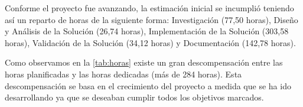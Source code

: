 \documentclass[../main.tex]{subfiles}
\begin{document}
Conforme el proyecto fue avanzando, la estimación inicial se incumplió teniendo así un reparto de horas de la siguiente forma: Investigación (77,50 horas), Diseño y Análisis de la Solución (26,74 horas), Implementación de la Solución (303,58 horas), Validación de la Solución (34,12 horas) y Documentación (142,78 horas).

\begin{table}[H]
    \centering
    \caption{Comparativa de horas estimadas y horas dedicadas al desarrollo del proyecto.}
    \label{tab:horas}
\end{table}

Como observamos en la \autoref{tab:horas} existe un gran descompensación entre las horas planificadas y las horas dedicadas (más de 284 horas). Esta descompensación se basa en el crecimiento del proyecto a medida que se ha ido desarrollando ya que se deseaban cumplir todos los objetivos marcados.
\end{document}
